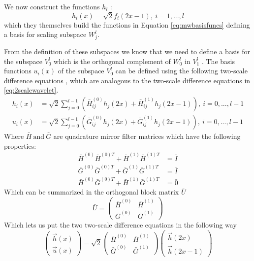 \documentclass[../master_thesis.tex]{subfiles}
\begin{document}
We now construct the functions $h_l$ \cite{Alpert1993}:
\begin{equation}
  h_i(x)= \sqrt{2}f_i(2x-1), \ i= 1, ..., l
\end{equation}
which they themselves build the functions in Equation \ref{eq:mwbasisfuncs}
defining a basis for scaling subspace $W_j^l$.

From the definition of these subspaces
we know that we need to define a basis for the subspace $V^l_0$ which is the
orthogonal complement of $W_0^l$ in $V^l_1$ \cite{Alpert1993}. The basis functions
$u_i(x)$ of the subspace $V^l_0$ can be defined using the following two-scale
difference equations \cite{Beylkin1999AdaptiveSO}, which are analogous to the
two-scale difference equations in \ref{eq:2scalewavelet}.
\begin{align}
  h_i(x) &= \sqrt{2}\sum^{l-1}_{j=0}\left(\bar{H}^{(0)}_{ij}h_j(2x) + \bar{H}^{(1)}_{ij}h_j(2x-1)\right), \ i = 0,...,l-1 \\
  u_i(x) &= \sqrt{2}\sum^{l-1}_{j=0}\left(\bar{G}^{(0)}_{ij}h_j(2x) + \bar{G}^{(1)}_{ij}h_j(2x-1)\right), \ i = 0,...,l-1
\end{align}
Where $ \bar{H} \ \text{and}\ \bar{G} $ are quadrature mirror filter matrices \cite{Beylkin1999AdaptiveSO} which have
the following properties:
\begin{align}
  \bar{H}^{(0)}\bar{H}^{(0)T} + \bar{H}^{(1)}\bar{H}^{(1)T} &= \bar{I} \\
  \bar{G}^{(0)}\bar{G}^{(0)T} + \bar{G}^{(1)}\bar{G}^{(1)T} &= \bar{I} \\
  \bar{H}^{(0)}\bar{G}^{(0)T} + \bar{H}^{(1)}\bar{G}^{(1)T} &= \bar{0}
\end{align}
Which can be summarized in the orthogonal block matrix $\bar{U}$ \cite{Beylkin1999AdaptiveSO}
\begin{equation}
  \bar{U} =
  \begin{pmatrix}
    \bar{H}^{(0)} & \bar{H}^{(1)} \\
    \bar{G}^{(0)} & \bar{G}^{(1)}
  \end{pmatrix}
\end{equation}
Which lets us put the two two-scale difference equations in the following way \cite{Sorland}
\begin{equation}
  \begin{pmatrix}
    \vec{h}(x) \\
    \vec{u}(x)
  \end{pmatrix}
  = \sqrt{2}
  \begin{pmatrix}
    \bar{H}^{(0)} & \bar{H}^{(1)} \\
    \bar{G}^{(0)} & \bar{G}^{(1)}
  \end{pmatrix}
  \begin{pmatrix}
    \vec{h}(2x) \\
    \vec{h}(2x-1)
  \end{pmatrix}
\end{equation}
\end{document}
